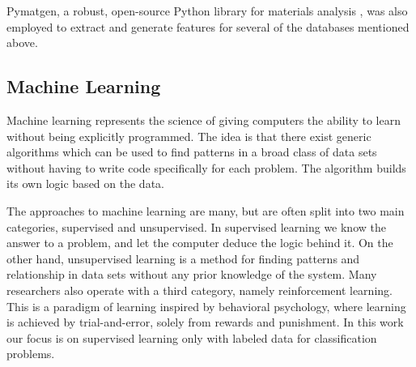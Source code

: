 \documentclass[superscriptaddress,unsortedaddress,
 amsmath,amssymb,
 aps,
]{revtex4-2}
\begin{document}
Pymatgen, a robust, open-source Python library for materials analysis \cite{pymatgen}, was also employed to extract and generate features for several of the databases mentioned above. 

\subsection*{Machine Learning} 

Machine learning represents the science of giving computers the ability to learn without being explicitly programmed. The idea is that there exist generic algorithms which can be used to find patterns in a broad class of data sets without having to write code specifically for each problem. The algorithm builds its own logic based on the data. 

The approaches to machine learning are many, but are often split into two main categories, supervised and unsupervised. In supervised learning we know the answer to a problem, and let the computer deduce the logic behind it. On the other hand, unsupervised learning is a method for finding patterns and relationship in data sets without any prior knowledge of the system. Many researchers also operate with a third category, namely reinforcement learning. This is a paradigm of learning inspired by behavioral psychology, where learning is achieved by trial-and-error, solely from rewards and punishment. In this work our focus is on supervised learning only with labeled data for classification problems.
\end{document}
